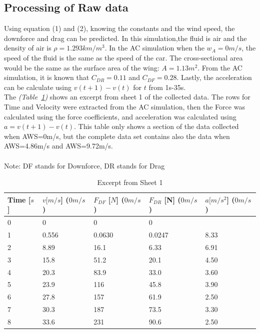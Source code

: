 \documentclass[11pt, a4paper]{article}
\begin{document}
\subsection{Processing of Raw data}
Using equation (1) and (2), knowing the constants and the wind speed, the downforce and drag can be predicted. In this simulation,the fluid is air and the density of air is $\rho=1.293km/m^3$. In the AC simulation when the $w_A=0m/s$, the speed of the fluid is the same as the speed of the car. 
The cross-sectional area would be the same as the surface area of the wing: $A=1.13m^2$. From the AC simulation, it is known that $C_{DR}=0.11$ and $C_{DF}=0.28$. 
Lastly, the acceleration can be calculate using $v(t+1)-v(t)$ for $t$ from 1s-35s. 
\newline \\
The \textit{(Table~\ref{tab:sheet1_excerpt})} shows an excerpt from sheet 1 of the collected data. The rows for Time and Velocity were extracted from the AC simulation, then the Force was calculated using the force coefficients, and acceleration was calculated using $a=v(t+1)-v(t)$.
This table only shows a section of the data collected when AWS=0m/s, but the complete data set contains also the data when AWS=4.86m/s and AWS=9.72m/s. 
\\\\
Note: DF stands for Downforce, DR stands for Drag
\begin{table}[!ht]
    \centering
    \caption{Excerpt from Sheet 1}
    \begin{tabular}{|l|l|l|l|l|}
    \hline
        {Time [$s$]} & {$v [m/s$] ($0 m/s$)} & {$F_{DF}$ [$N$] ($0 m/s$)} & {$F_{DR}$ [N] ($0 m/s$)} & {$a [m/s^2$] ($0 m/s$)} \\ \hline
        0 & 0 & 0 & 0 & \\ \hline
        1 & 0.556 & 0.0630 & 0.0247 & 8.33 \\ \hline
        2 & 8.89 & 16.1 & 6.33 & 6.91 \\ \hline
        3 & 15.8 & 51.2 & 20.1 & 4.50 \\ \hline
        4 & 20.3 & 83.9 & 33.0 & 3.60 \\ \hline
        5 & 23.9 & 116 & 45.8 & 3.90 \\ \hline
        6 & 27.8 & 157 & 61.9 & 2.50 \\ \hline
        7 & 30.3 & 187 & 73.5 & 3.30 \\ \hline
        8 & 33.6 & 231 & 90.6 & 2.50 \\ \hline
    \end{tabular}
~\label{tab:sheet1_excerpt}
\end{table} 
\end{document}
